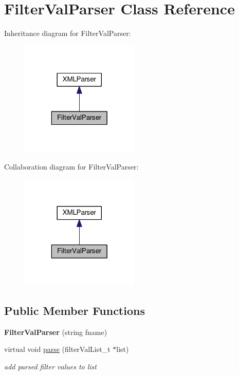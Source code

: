 \hypertarget{classFilterValParser}{}\section{Filter\+Val\+Parser Class Reference}
\label{classFilterValParser}


Inheritance diagram for Filter\+Val\+Parser\+:
\nopagebreak
\begin{figure}[H]
\begin{center}
\leavevmode
\includegraphics[width=160pt]{classFilterValParser__inherit__graph}
\end{center}
\end{figure}


Collaboration diagram for Filter\+Val\+Parser\+:
\nopagebreak
\begin{figure}[H]
\begin{center}
\leavevmode
\includegraphics[width=160pt]{classFilterValParser__coll__graph}
\end{center}
\end{figure}
\subsection*{Public Member Functions}
\begin{DoxyCompactItemize}
\item 
\mbox{\label{classFilterValParser_a700b6e94b751d4701f68d661a0f7c9ad}} 
{\bfseries Filter\+Val\+Parser} (string fname)
\item 
\mbox{\label{classFilterValParser_a054b191942c507d50a9be3ffafe685fd}} 
virtual void \hyperlink{classFilterValParser_a054b191942c507d50a9be3ffafe685fd}{parse} (filter\+Val\+List\+\_\+t $\ast$list)
\begin{DoxyCompactList}\small\item\em add parsed filter values to list \end{DoxyCompactList}\end{DoxyCompactItemize}
